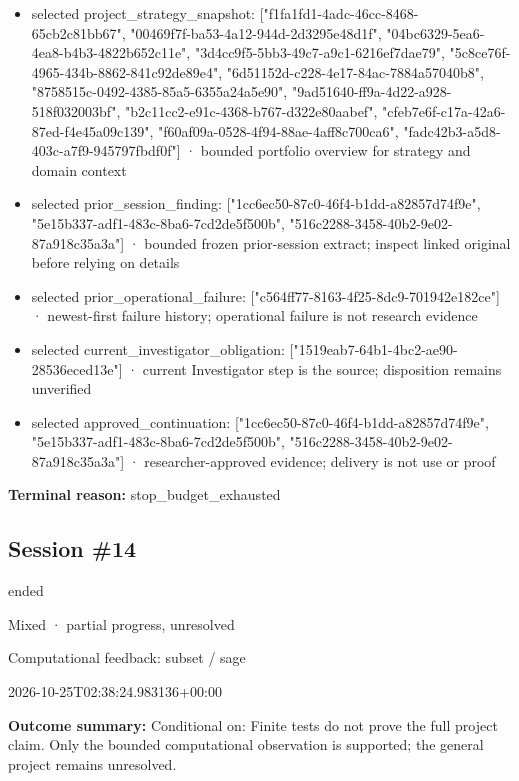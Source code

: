 \documentclass[11pt]{article}
\begin{document}
\begin{itemize}
\item selected project\_strategy\_snapshot: ["f1fa1fd1-4adc-46cc-8468-65cb2c81bb67", "00469f7f-ba53-4a12-944d-2d3295e48d1f", "04bc6329-5ea6-4ea8-b4b3-4822b652c11e", "3d4cc9f5-5bb3-49c7-a9c1-6216ef7dae79", "5c8ce76f-4965-434b-8862-841c92de89e4", "6d51152d-c228-4e17-84ac-7884a57040b8", "8758515c-0492-4385-85a5-6355a24a5e90", "9ad51640-ff9a-4d22-a928-518f032003bf", "b2c11cc2-e91c-4368-b767-d322e80aabef", "cfeb7e6f-c17a-42a6-87ed-f4e45a09c139", "f60af09a-0528-4f94-88ae-4aff8c700ca6", "fadc42b3-a5d8-403c-a7f9-945797fbdf0f"] · bounded portfolio overview for strategy and domain context
\item selected prior\_session\_finding: ["1cc6ec50-87c0-46f4-b1dd-a82857d74f9e", "5e15b337-adf1-483c-8ba6-7cd2de5f500b", "516c2288-3458-40b2-9e02-87a918c35a3a"] · bounded frozen prior-session extract; inspect linked original before relying on details
\item selected prior\_operational\_failure: ["c564ff77-8163-4f25-8dc9-701942e182ce"] · newest-first failure history; operational failure is not research evidence
\item selected current\_investigator\_obligation: ["1519eab7-64b1-4bc2-ae90-28536eced13e"] · current Investigator step is the source; disposition remains unverified
\item selected approved\_continuation: ["1cc6ec50-87c0-46f4-b1dd-a82857d74f9e", "5e15b337-adf1-483c-8ba6-7cd2de5f500b", "516c2288-3458-40b2-9e02-87a918c35a3a"] · researcher-approved evidence; delivery is not use or proof
\end{itemize}
\textbf{Terminal reason:} stop\_budget\_exhausted\par
\subsection{Session \#14}
\begin{description}[style=nextline,font=\normalfont\bfseries,leftmargin=0pt,labelsep=0pt]
\item[Execution status] ended
\item[Outcome] Mixed · partial progress, unresolved
\item[Strategy] Computational feedback: subset / sage
\item[Started] 2026-10-25T02:38:24.983136+00:00
\end{description}
\textbf{Outcome summary:} Conditional on: Finite tests do not prove the full project claim. Only the bounded computational observation is supported; the general project remains unresolved.\par
\end{document}
